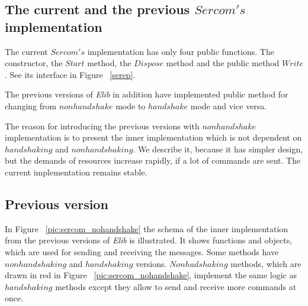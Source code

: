 \subsection{The current and the previous $Sercom's$ implementation}\label{sec:versions}
  The current $Sercom's$ implementation has only four public functions.
  The constructor, the $Start$ method, the $Dispose$ method and the public method $Write$. 
  See its interface in Figure ~\ref{serep}.	

  The previous versions of {\it Elib} in addition have implemented public method for changing from $nonhandshake$ mode to 
  $handshake$ mode and vice versa.

  The reason for introducing the previous versions with $nonhandshake$ implementation is to present 
  the inner implementation which is not dependent on $handshaking$ and $nonhandshaking$.
  We describe it, because it has simpler design, but the demands of resources increase rapidly, if a lot of commands are sent.
  The current implementation remains stable.
\subsection*{Previous version}\label{previous}
  In  Figure ~\ref{pic:sercom_nohandshake} the schema of the inner implementation 
  from the previous versions of {\it Elib} is illustrated.
  It shows functions and objects, which are used for sending and receiving the messages.
  Some methods have $nonhandshaking$ and $handshaking$ versions.
  $Nonhadshaking$ methods, which are drawn in red	in Figure ~\ref{pic:sercom_nohandshake}, implement the same logic 
  as $handshaking$ methods except they allow to send and receive more commands
  at once.

